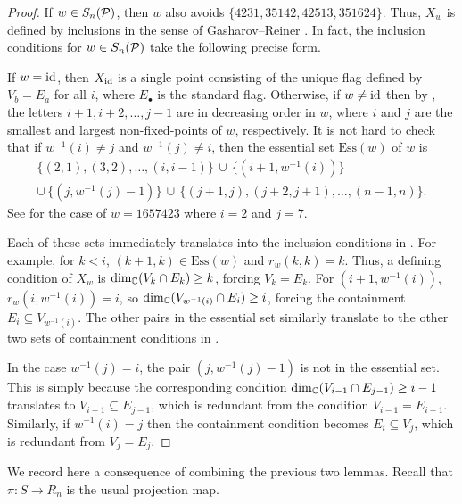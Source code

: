 \begin{proof}
    If $w\in S_n(\mathcal{P})$, then $w$ also avoids \(\{4231, 35142, 42513,  351624\}\). Thus, $X_w$ is defined by inclusions in the sense of Gasharov--Reiner \cite{GasharovReiner}. In fact, the inclusion conditions for $w\in S_n(\mathcal{P})$ take the following precise form.

    If $w=\mathrm{id}$, then $X_{\mathrm{id}}$ is a single point consisting of the unique flag defined by $V_b=E_a$ for all $i$, where $E_\bullet$ is the standard flag. Otherwise, if $w\neq \mathrm{id}$ then by , the letters $i+1,i+2,\dots, j-1$ are in decreasing order in $w$, where $i$ and $j$ are the smallest and largest non-fixed-points of $w$, respectively. It is not hard to check that if $w^{-1}(i)\neq j$ and $w^{-1}(j)\neq i$, then the essential set $\mathrm{Ess}(w)$ of $w$ is
    \begin{gather*}
    \{(2,1),(3,2),\dots, (i,i-1)\}\,\cup\, \{(i+1,w^{-1}(i))\}\\ 
    \cup\,  \{(j,w^{-1}(j)-1)\}\, \cup \,\{(j+1,j),(j+2,j+1),\dots, (n-1,n)\}.
    \end{gather*}
    See  for the case of $w=1657423$ where $i=2$ and $j=7$. 
    
    Each of these sets immediately translates into the inclusion conditions in . For example, for $k<i$, $(k+1,k)\in \mathrm{Ess}(w)$ and $r_w(k,k) = k$. Thus, a defining condition of $X_w$ is $\dim_{\mathbb{C}}(V_k\cap E_k)\geq k$, forcing $V_k = E_k$. For $(i+1,w^{-1}(i))$, $r_w(i,w^{-1}(i)) = i$, so $\dim_{\mathbb{C}}(V_{w^{-1}(i)}\cap E_i)\geq i$, forcing the containment $E_i\subseteq V_{w^{-1}(i)}$. The other pairs in the essential set similarly translate to the other two sets of containment conditions in . 
    
    In the case $w^{-1}(j)=i$, the pair $(j,w^{-1}(j)-1)$ is not in the essential set. This is simply because the corresponding condition $\dim_{\mathbb{C}}(V_{i-1}\cap E_{j-1})\geq i-1$ translates to $V_{i-1}\subseteq E_{j-1}$, which is redundant from the condition $V_{i-1} = E_{i-1}$. Similarly, if $w^{-1}(i) = j$ then the containment condition becomes $E_i\subseteq V_j$, which is redundant from $V_j = E_j$.
\end{proof}

We record here a consequence of combining the previous two lemmas. Recall that $\pi:S\to R_n$ is the usual projection map.

